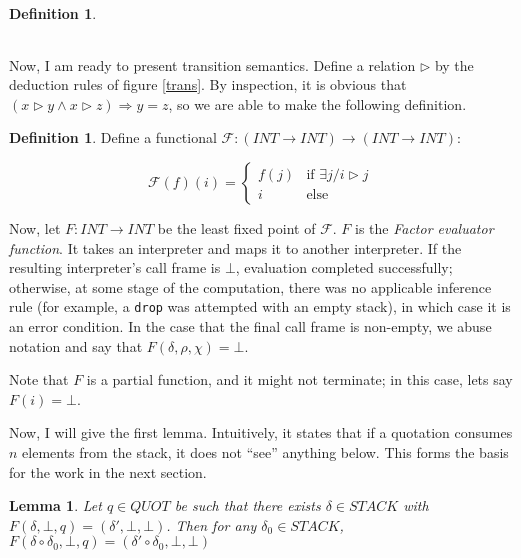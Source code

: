 \documentclass{amsart}
\theoremstyle{plain}
\newtheorem{lemma}[theorem]{Lemma}
\theoremstyle{definition}
\newtheorem{definition}[theorem]{Definition}
\begin{document}
\begin{definition}
\begin{figure}
\begin{tabularx}{12cm}{lc}
\hline
\end{tabularx}

\end{figure}

Now, I am ready to present transition semantics. 
Define a relation $\rhd$ by the deduction rules of figure \ref{trans}. By inspection, it is obvious that $(x\rhd y \wedge x \rhd z) \Rightarrow y=z$, so we are able to make the following definition.

\begin{definition}
Define a functional $\mathcal{F}: (INT \rightarrow INT) \rightarrow (INT \rightarrow INT)$:

$$
\mathcal{F}(f)(i) = 
\begin{cases}
f(j)&\text{if $\exists j / i\rhd j$}\\
i&\text{else}
\end{cases}
$$

\end{definition}

Now, let $F: INT \rightarrow INT$ be the least fixed point of $\mathcal{F}$. $F$ is the \emph{Factor evaluator function}. It takes an interpreter and maps it to another
interpreter. If the resulting interpreter's call frame is $\bot$, evaluation completed
successfully; otherwise, at some stage of the computation, there was no applicable
inference rule (for example, a \texttt{drop} was attempted with an empty stack), in which case it is an error condition. In the case that the final call frame is non-empty, we abuse notation and say that $F(\delta,\rho,\chi)=\bot$.

Note that $F$ is a partial function, and it might not terminate; in this case, lets say $F(i) = \bot$.

\end{definition}

Now, I will give the first lemma. Intuitively, it states that if a quotation consumes $n$ elements from the stack, it does not ``see'' anything below. This forms the basis for the work in the next section.

\begin{lemma}\label{dipping}
Let $q\in QUOT$ be such that there exists $\delta\in STACK$ with $F(\delta,\bot,q)=(\delta\prime,\bot,\bot)$. Then for any $\delta_0\in STACK$,
$F(\delta\circ\delta_0,\bot,q)=(\delta\prime\circ\delta_0,\bot,\bot)$
\end{lemma}
\end{document}
